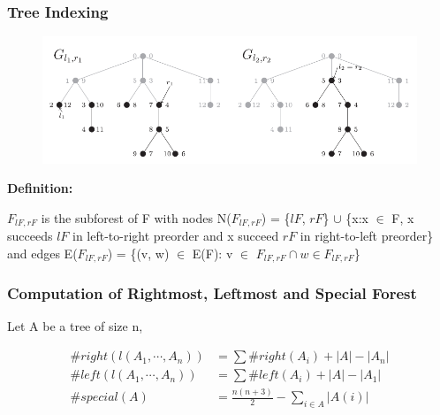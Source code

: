 \documentclass{beamer}
\begin{document}
\begin{frame}
\frametitle{Tree Indexing}
\begin{figure}
	\includegraphics[width=1.0\linewidth]{TreeIndexing}
	\label{TreeIndexing} 
	\centering
\end{figure}
\textbf{Definition:}

$F_{lF, rF}$ is the subforest of F with nodes N($F_{lF, rF}$) = \{$lF$, $rF$\} $\cup$ \{x:x $\in$ F, x succeeds $lF$ in left-to-right preorder and x succeed $rF$ in right-to-left preorder\} and edges E($F_{lF, rF}$) = \{(v, w) $\in$ E(F): v $\in$ $F_{lF, rF} \cap w \in F_{lF, rF}$\}

\end{frame}

\begin{frame}
\frametitle{Computation of Rightmost, Leftmost and Special Forest}
Let A be a tree of size n,

\begingroup

\centering
{}

\endgroup
\begin{align*}
\#right(l(A_1,\cdots, A_n)) &= \sum\#right(A_i) + \left\vert A \right\vert - \left\vert A_n \right\vert \\
\#left(l(A_1,\cdots, A_n)) &= \sum\#left(A_i) + \left\vert A \right\vert - \left\vert A_1 \right\vert \\
\#special(A) &= \frac{n(n+3)}{2} - \sum_{i \in A} \left\vert A(i) \right\vert \\
\end{align*}

\end{frame}
\end{document}
